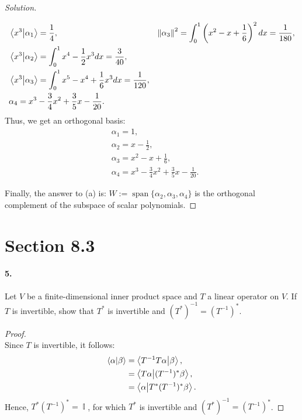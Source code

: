 \documentclass{article}
\theoremstyle{plain}
\theoremstyle{definition}
\theoremstyle{remark}
\DeclareMathOperator{\Span}{span}
\renewcommand{\dd}{d}
\DeclareMathOperator{\Id}{\mathbb{I}}
\begin{document}
\begin{proof}[Solution]
\begin{itemize}
\begin{align*}
              &\braket{x^3}{\alpha_1} = \frac{1}{4},                                             &&  \norm{\alpha_3}^2 = \int_0^1 \left(x^2-x+\frac{1}{6}\right)^2 \dd x = \frac{1}{180}, \\
              &\braket{x^3}{\alpha_2} =\int_0^1 x^4 - \frac{1}{2}x^3 dx  = \frac{3}{40},          &&  \\
              &\braket{x^3}{\alpha_3} = \int_0^1 x^5 - x^4 +\frac{1}{6}x^3 \dd x  = \frac{1}{120}, &&     \\
              & \alpha_4 = x^3- \frac{3}{4}x^2 + \frac{3}{5}x -\frac{1}{20}.  &&
            \end{align*}
            Thus, we get an orthogonal basis:
            \begin{align*}
              & \alpha_1 = 1,\\
              & \alpha_2 = x-\frac{1}{2},\\
              & \alpha_3 = x^2 - x + \frac{1}{6},\\
              & \alpha_4 = x^3- \frac{3}{4}x^2 + \frac{3}{5}x -\frac{1}{20}.
            \end{align*}
        \end{itemize}
        Finally, the answer to (a) is: $W:=\Span \{\alpha_2,\alpha_3,\alpha_4\}$ is the orthogonal complement of the subspace of scalar polynomials.
      \end{proof}

  \section*{Section 8.3}

    \paragraph{5.}
    Let $V$ be a finite-dimensional inner product space and $T$ a linear operator on $V$. If $T$ is invertible, show that $T^*$ is invertible and $(T^*)^{-1} = (T^{-1})^*$.

      \begin{proof}$ $\\
          Since $T$ is invertible, it follows:
          \begin{align*}
            \bra{\alpha}\ket{\beta} & = \bra{T^{-1}T\alpha}\ket{\beta},\\
                &= \bra{T\alpha}\ket{(T^{-1})^*\beta},\\
                &=\bra{\alpha}\ket{T^*(T^{-1})^*\beta}.
          \end{align*}
          Hence, $T^*(T^{-1})^* = \Id$, for which $T^*$ is invertible and $(T^*)^{-1} = (T^{-1})^* $.

      \end{proof}
\end{document}
